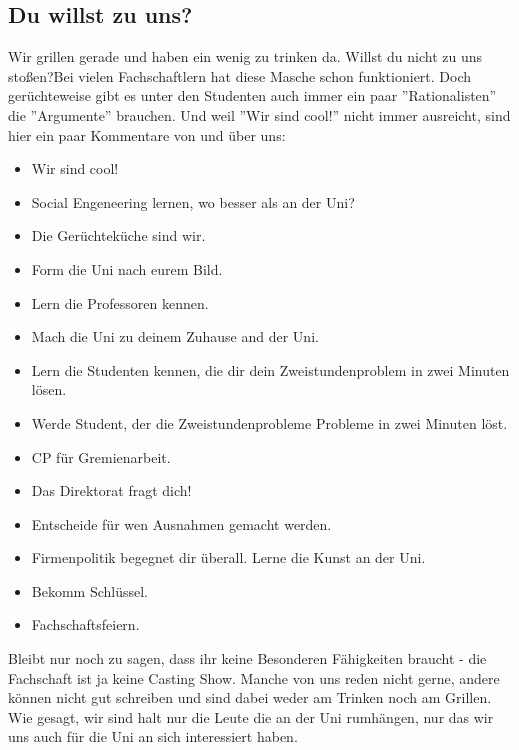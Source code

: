     
\subsection{Du willst zu uns?}
    \glqq Wir grillen gerade und haben ein wenig zu trinken da. Willst du nicht zu uns stoßen?\grqq { }Bei vielen Fachschaftlern hat diese Masche schon funktioniert. Doch gerüchteweise gibt es unter den Studenten auch immer ein paar ''Rationalisten'' die ''Argumente'' brauchen. Und weil ''Wir sind cool!'' nicht immer ausreicht, sind hier ein paar Kommentare von und über uns:
    \begin{itemize}
        \item Wir sind cool!
        \item Social Engeneering lernen, wo besser als an der Uni?
        \item Die Gerüchteküche sind wir.
        \item Form die Uni nach eurem Bild.
        \item Lern die Professoren kennen.
        \item Mach die Uni zu deinem Zuhause and der Uni.
        \item Lern die Studenten kennen, die dir dein Zweistundenproblem in zwei Minuten lösen.
        \item Werde Student, der die Zweistundenprobleme Probleme in zwei Minuten löst.
        \item CP für Gremienarbeit.
        \item Das Direktorat fragt dich!
        \item Entscheide für wen Ausnahmen gemacht werden.
        \item Firmenpolitik begegnet dir überall. Lerne die Kunst an der Uni.
        \item Bekomm Schlüssel.
        \item Fachschaftsfeiern.
    \end{itemize}
    Bleibt nur noch zu sagen, dass ihr keine Besonderen F\"ahigkeiten braucht - die Fachschaft ist ja keine Casting Show.
    Manche von uns reden nicht gerne, andere k\"onnen nicht gut schreiben und sind dabei weder am Trinken noch am Grillen.
    Wie gesagt, wir sind halt nur die Leute die an der Uni rumh\"angen, nur das wir uns auch f\"ur die Uni an sich interessiert haben.

